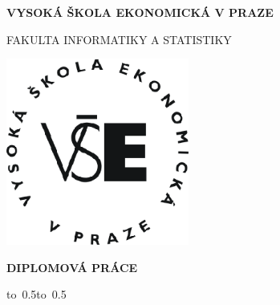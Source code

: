 \documentclass[12pt,a4paper]{report}
\begin{document}


\pagestyle{empty}
\begin{center}

\large

{\bfseries VYSOKÁ ŠKOLA EKONOMICKÁ V PRAZE}

\medskip

FAKULTA INFORMATIKY A STATISTIKY

\vfill

\centerline{\mbox{\includegraphics[width=60mm]{vse.eps}}}

\vfill

{\bf\Large DIPLOMOVÁ PRÁCE}

\vfill
\vspace{10cm}

\vfill


\hbox{\hbox to 0.5\hsize{%
2016
\hss}\hbox to 0.5}

\end{center}
\pagestyle{empty}
\end{document}
